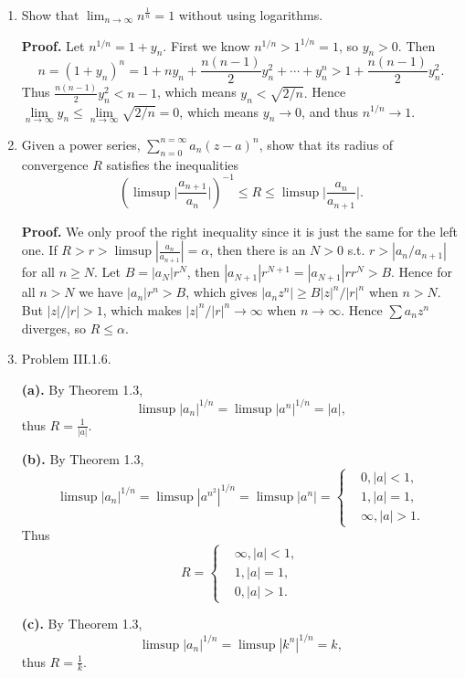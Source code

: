 \documentclass{article}%
\begin{document}
\begin{enumerate}

\item Show that $\lim_{n\to \infty}{n^{\frac{1}{n}}} = 1$ without using logarithms.

\textbf{Proof.} Let $n^{1/n} = 1+y_n $. First we know $n^{1/n} > 1^{1/n} = 1 $, so $y_{n} > 0$. Then 
$$
n = (1+y_n)^n = 1+ny_n+\frac{n(n-1)}{2}y_n^2+\cdots+y_n^n > 1+\frac{n(n-1)}{2}y_n^2.
$$
Thus $\frac{n(n-1)}{2}y_n^2 < n-1 $, which means $y_n < \sqrt{2/n}. $ Hence $\lim\limits_{n\to\infty} y_n \le \lim\limits_{n\to\infty}\sqrt{2/n} = 0$, which means $y_n\to 0 $, and thus $n^{1/n}\to 1 $.


\item Given a power series, $\sum_{n=0}^{n=\infty} a_n(z - a)^n$, show that its radius of convergence $R$ satisfies the inequalities$$(\limsup{\vert \frac{a_{n+1}}{a_n} \vert})^{-1} \leq R \leq \limsup{\vert \frac{a_{n}}{a_{n+1}} \vert}.$$

\textbf{Proof.} We only proof the right inequality since it is just the same for the left one. If $R > r > \limsup|\frac{a_n}{a_{n+1}}| = \alpha $, then there is an $N > 0$ s.t. $r > |a_n/a_{n+1}| $ for all $n \ge N$. Let $B = |a_N|r^N $, then $|a_{N+1}|r^{N+1} = |a_{N+1}|rr^{N} > B $. Hence for all $n > N$ we have $|a_n|r^n > B $, which gives $|a_nz^n| \ge B |z|^n/|r|^n $ when $n > N$. But $|z|/|r| > 1$, which makes $|z|^n/|r|^n \to\infty $ when $n\to\infty$. Hence $\sum a_nz^n $ diverges, so $R \le \alpha$.


\item Problem III.1.6.

\textbf{(a).} By Theorem 1.3, 
$$
\limsup |a_n|^{1/n} = \limsup |a^n|^{1/n} = |a|,
$$
thus $R = \frac{1}{|a|}$.

\textbf{(b).} By Theorem 1.3,
$$
\limsup |a_n|^{1/n} = \limsup |a^{n^2}|^{1/n} = \limsup |a^n| = \left\{
\begin{aligned} 
&0, |a| < 1, \\
&1, |a| = 1, \\
&\infty, |a| > 1.
\end{aligned}
\right.
$$
Thus 
$$
R = \left\{
\begin{aligned}
&\infty, |a| < 1,\\
&1, |a| = 1,\\
&0, |a| > 1.
\end{aligned}
\right.
$$

\textbf{(c).} By Theorem 1.3,
$$
\limsup |a_n|^{1/n} = \limsup |k^n|^{1/n} = k,
$$
thus $R = \frac{1}{k}$.


\end{enumerate}
\end{document}
